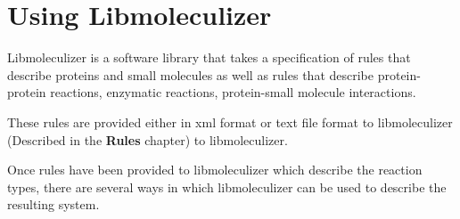 \chapter{Using Libmoleculizer}
Libmoleculizer is a software library that takes a specification of
rules that describe proteins and small molecules as well as rules that
describe protein-protein reactions, enzymatic reactions, protein-small
molecule interactions.  

These rules are provided either in xml format or text file format to
libmoleculizer (Described in the {\bf Rules} chapter) to
libmoleculizer. 

Once rules have been provided to libmoleculizer which describe the
reaction types, there are several ways in which libmoleculizer can be
used to describe the resulting system.  

